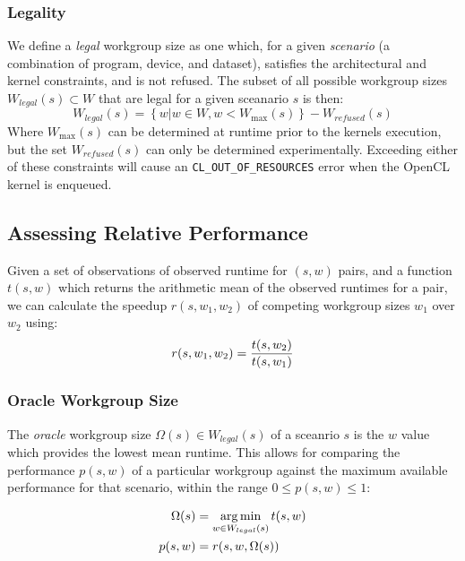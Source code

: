 \TODO{\ldots}


\subsubsection{Legality}

We define a \emph{legal} workgroup size as one which, for a given
\emph{scenario} (a combination of program, device, and dataset),
satisfies the architectural and kernel constraints, and is not
refused. The subset of all possible workgroup sizes
$W_{legal}(s) \subset W$ that are legal for a given sceanario $s$ is
then:
%
\begin{equation}
  W_{legal}(s) = \left\{w | w \in W, w < W_{\max}(s) \right\} - W_{refused}(s)
\end{equation}
%
Where $W_{\max}(s)$ can be determined at runtime prior to the kernels
execution, but the set $W_{refused}(s)$ can only be determined
experimentally. Exceeding either of these constraints will cause an
\texttt{CL\_OUT\_OF\_RESOURCES} error when the OpenCL kernel is
enqueued.


\subsection{Assessing Relative Performance}

Given a set of observations of observed runtime for $(s,w)$ pairs, and
a function $t(s,w)$ which returns the arithmetic mean of the observed
runtimes for a pair, we can calculate the speedup $r(s, w_1, w_2)$ of
competing workgroup sizes $w_1$ over $w_2$ using:
%
\begin{equation}
  r(s, w_1, w_2) = \frac{t(s,w_2)}{t(s,w_1)}\\
\end{equation}
%

\subsubsection{Oracle Workgroup Size}

The \emph{oracle} workgroup size $\Omega(s) \in W_{legal}(s)$ of a
sceanrio $s$ is the $w$ value which provides the lowest mean
runtime. This allows for comparing the performance $p(s,w)$ of a
particular workgroup against the maximum available performance for
that scenario, within the range $0 \le p(s,w) \le 1$:

\begin{align}
  \Omega(s) &= \operatorname*{arg\,min}_{w \in W_{legal}(s)} t(s,w)\\
  p(s,w) &= r(s, w, \Omega(s))
\end{align}


